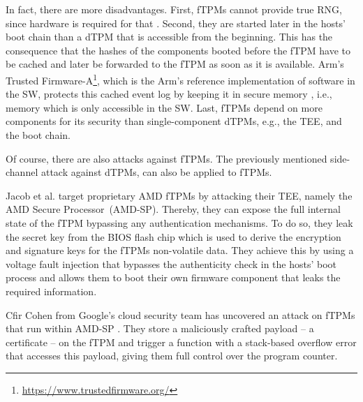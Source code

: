 In fact, there are more disadvantages. First, \acp{fTPM} cannot provide true RNG, since hardware is required for that \cite{Stipcevic2014}.
Second, they are started later in the hosts' boot chain than a dTPM that is accessible from the beginning. This has the consequence that the hashes of the components booted before the fTPM have to be cached and later be forwarded to the \ac{fTPM} as soon as it is available. Arm's Trusted Firmware-A\footnote{\url{https://www.trustedfirmware.org/}}, which is the Arm's reference implementation of software in the \ac{SW}, protects this cached event log by keeping it in secure memory \cite{tf-a-measured-boot}, i.e., memory which is only accessible in the \ac{SW}. Last, fTPMs depend on more components for its security than single-component dTPMs, e.g., the \ac{TEE}, and the boot chain.

Of course, there are also attacks against fTPMs.
The previously mentioned side-channel attack \cite{Moghimi2019} against dTPMs, can also be applied to fTPMs.

Jacob et al. \cite{Jacob2023} target proprietary AMD fTPMs by attacking their \ac{TEE}, namely the AMD Secure Processor~(AMD-SP). Thereby, they can expose the full internal state of the fTPM bypassing any authentication mechanisms. To do so, they leak the secret key from the BIOS flash chip which is used to derive the encryption and signature keys for the fTPMs non-volatile data. They achieve this by using a voltage fault injection that bypasses the authenticity check in the hosts' boot process and allows them to boot their own firmware component that leaks the required information.

Cfir Cohen from Google's cloud security team has uncovered an attack on fTPMs that run within AMD-SP \cite{cohen}. They store a maliciously crafted payload -- a certificate -- on the fTPM and trigger a function with a stack-based overflow error that accesses this payload, giving them full control over the program counter.



